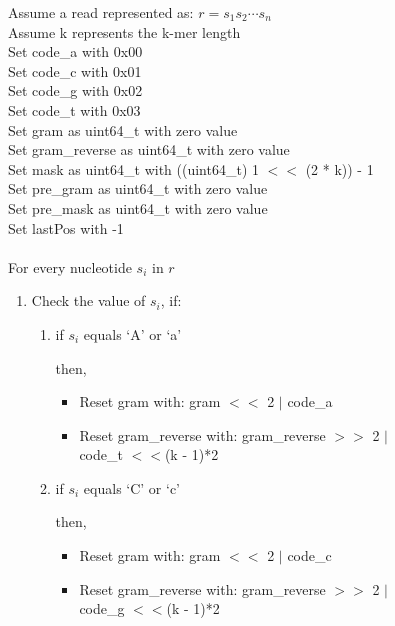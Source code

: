 \documentclass[12pt,openany]{llncs}
\begin{document}
\begin{figure}
\vspace{0.1cm}
\begin{bordered}
Assume a read represented as: $r=s_1s_2\cdots s_n$
\\
Assume k represents the k-mer length
\\
Set code\_a with 0x00
\\
Set code\_c with 0x01
\\
Set code\_g with 0x02
\\
Set code\_t with 0x03
\\
Set gram as uint64\_t with zero value
\\
Set gram\_reverse as uint64\_t with zero value
\\
Set mask as uint64\_t with ((uint64\_t) 1 $<<$ (2 * k)) - 1
\\
Set pre\_gram as uint64\_t with zero value
\\
Set pre\_mask as uint64\_t with zero value
\\
Set lastPos with -1
\\
\\
For every nucleotide $s_i$ in $r$ 
\begin{enumerate}
\addtolength{\itemindent}{1cm} 
\item Check the value of $s_i$, if: 
\vspace{-2mm}
\begin{enumerate}
\addtolength{\itemindent}{1cm}

	\item if $s_i$ equals `A' or `a'
	
	\noindent\hspace{1cm}then,
	
	\begin{itemize}
    \addtolength{\itemindent}{1cm}
	  \item Reset gram with: gram $<<$ 2 $|$ code\_a
      \item Reset gram\_reverse with: gram\_reverse $>>$ 2 $|$ code\_t $<<$(k - 1)*2
	\end{itemize}
	
	\item if $s_i$ equals `C' or `c'
	
	\noindent\hspace{1cm}then,

	\begin{itemize}
    \addtolength{\itemindent}{1cm}
	  \item Reset gram with: gram $<<$ 2 $|$ code\_c
	  \item Reset gram\_reverse with: gram\_reverse $>>$ 2 $|$ code\_g $<<$(k - 1)*2
	\end{itemize}
	

\end{enumerate}
\end{enumerate}
\end{bordered}
\end{figure}
\end{document}
